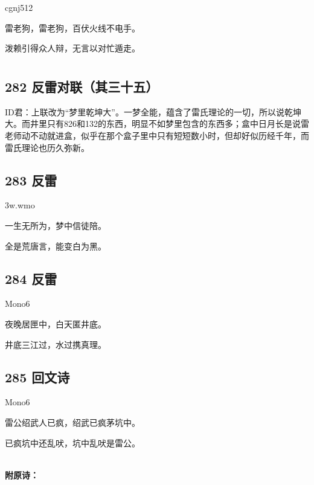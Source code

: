 {cgnj512}

雷老狗，雷老狗，百伏火线不电手。

泼赖引得众人辩，无言以对忙遁走。

\hypertarget{section-3}{%
\section{}\label{section-3}}

\hypertarget{ux53cdux96f7ux5bf9ux8054ux5176ux4e09ux5341ux4e94}{%
\subsection{282
反雷对联（其三十五）}\label{ux53cdux96f7ux5bf9ux8054ux5176ux4e09ux5341ux4e94}}

ID君：上联改为``梦里乾坤大''。一梦全能，蕴含了雷氏理论的一切，所以说乾坤大。而井里只有826和132的东西，明显不如梦里包含的东西多；盒中日月长是说雷老师动不动就进盒，似乎在那个盒子里中只有短短数小时，但却好似历经千年，而雷氏理论也历久弥新。

\hypertarget{ux53cdux96f7-9}{%
\subsection{283 反雷}\label{ux53cdux96f7-9}}

{3w.wmo}

一生无所为，梦中信徒陪。

全是荒唐言，能变白为黑。

\hypertarget{ux53cdux96f7-10}{%
\subsection{284 反雷}\label{ux53cdux96f7-10}}

{Mono6}

夜晚居匣中，白天匿井底。

井底三江过，水过携真理。

\hypertarget{ux56deux6587ux8bd7}{%
\subsection{285 回文诗}\label{ux56deux6587ux8bd7}}

{Mono6}

雷公绍武人已疯，绍武已疯茅坑中。

已疯坑中还乱吠，坑中乱吠是雷公。

~\\

\textbf{附原诗：}

